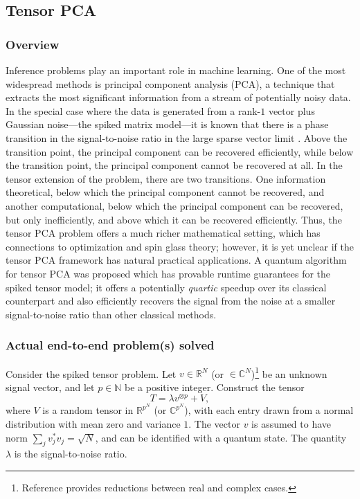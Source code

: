 \begin{refsection}

\subsection{Tensor PCA}\label{appl:TPCA}



\subsubsection*{Overview}
Inference problems play an important role in machine learning. One of the most widespread methods is principal component analysis (PCA), a technique that extracts the most significant information from a stream of potentially noisy data. In the special case where the data is generated from a rank-$1$ vector plus Gaussian noise---the spiked matrix model---it is known that there is a phase transition in the signal-to-noise ratio in the large sparse vector limit \cite{hoyle2003pca}. Above the transition point, the principal component can be recovered efficiently, while below the transition point, the principal component cannot be recovered at all. In the tensor extension of the problem, there are two transitions. One information theoretical, below which the principal component cannot be recovered, and another computational, below which the principal component can be recovered, but only inefficiently, and above which it can be recovered efficiently. Thus, the tensor PCA problem offers a much richer mathematical setting, which has connections to optimization and spin glass theory; however, it is yet unclear if the tensor PCA framework has natural practical applications. A quantum algorithm \cite{hastings2020classical} for tensor PCA was proposed which has provable runtime guarantees for the spiked tensor model; it offers a potentially \emph{quartic} speedup over its classical counterpart and also efficiently recovers the signal from the noise at a  smaller signal-to-noise ratio than other classical methods.


\subsubsection*{Actual end-to-end problem(s) solved}
Consider the spiked tensor problem. Let $v\in \mathbb{R}^N$ (or $\in \mathbb{C}^N$)\footnote{Reference \cite{hastings2020classical} provides reductions between real and complex cases.} be an unknown signal vector, and let $p \in \mathbb{N}$ be a positive integer. Construct the tensor 
\begin{equation}
T= \lambda v^{\otimes p} + V,
\end{equation}
where $V$ is a random tensor in $\mathbb{R}^{p^N}$ (or $\mathbb{C}^{p^N}$), with each entry drawn from a normal distribution with mean zero and variance $1$. The vector $v$ is assumed to have norm $\sum_j v_j^* v_j=\sqrt{N}$, and can be identified with a quantum state. The quantity $\lambda$ is the signal-to-noise ratio. 


\end{refsection}
